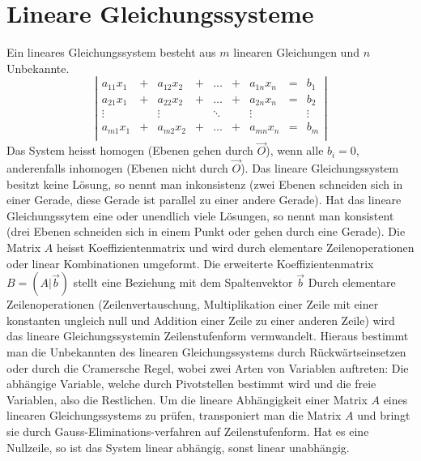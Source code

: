 \section{Lineare Gleichungssysteme}
Ein lineares Gleichungssystem besteht aus $m$ linearen Gleichungen und $n$ Unbekannte.
\begin{equation}
\boxed{\left\vert
\begin{array}{ccccccccc}
a_{11}x_1&+&a_{12}x_2&+&\dotso&+&a_{1n}x_n&=&b_1\\
a_{21}x_1&+&a_{22}x_2&+&\dotso&+&a_{2n}x_n&=&b_2\\
\vdots&&\vdots&&\ddots&&\vdots&&\vdots\\
a_{m1}x_1&+&a_{m2}x_2&+&\dotso&+&a_{mn}x_n&=&b_m\\
\end{array}
\right\vert}
\end{equation}
Das System heisst homogen (Ebenen gehen durch $\overrightarrow{O}$), wenn alle $b_i=0$, anderenfalls inhomogen (Ebenen nicht durch $\overrightarrow{O}$).
\newline\newline
Das lineare Gleichungssystem besitzt keine Lösung, so nennt man inkonsistenz (zwei Ebenen schneiden sich in einer Gerade, diese Gerade ist parallel zu einer andere Gerade). Hat das lineare Gleichungssytem eine oder unendlich viele Lösungen, so nennt man konsistent (drei Ebenen schneiden sich in einem Punkt oder gehen durch eine Gerade).
\newline\newline
Die Matrix $A$ heisst Koeffizientenmatrix und wird durch elementare Zeilenoperationen oder linear Kombinationen umgeformt. Die erweiterte Koeffizientenmatrix $B=\left(A|\overrightarrow{b}\right)$ stellt eine Beziehung mit dem Spaltenvektor $\overrightarrow{b}$
\newline\newline
Durch elementare Zeilenoperationen (Zeilenvertauschung, Multiplikation einer Zeile mit einer konstanten ungleich null und Addition einer Zeile zu einer anderen Zeile) wird das lineare Gleichungssystemin Zeilenstufenform vermwandelt. Hieraus bestimmt man die Unbekannten des linearen Gleichungssystems durch Rückwärtseinsetzen oder durch die Cramersche Regel, wobei zwei Arten von Variablen auftreten: Die abhängige Variable, welche durch Pivotstellen bestimmt wird und die freie Variablen, also die Restlichen.
\newline\newline
Um die lineare Abhängigkeit einer Matrix $A$ eines linearen Gleichungssystems zu prüfen, transponiert man die Matrix $A$ und bringt sie durch Gauss-Eliminations-verfahren auf Zeilenstufenform. Hat es eine Nullzeile, so ist das System linear abhängig, sonst linear unabhängig.
